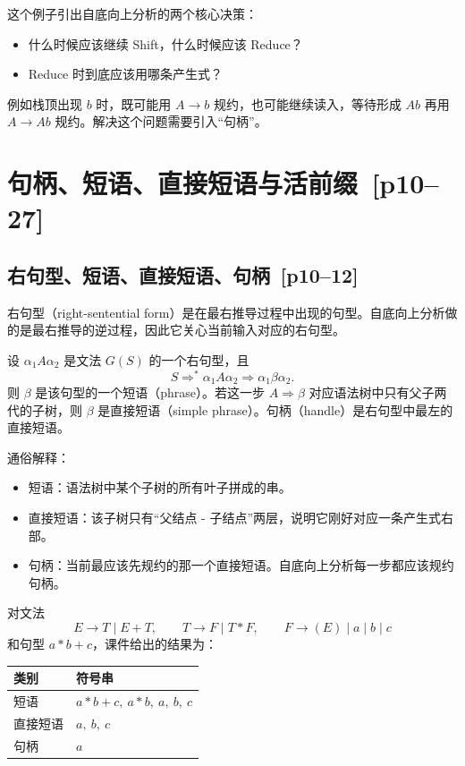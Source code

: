 \documentclass[UTF8,fontset=none,11pt]{ctexart}
\newenvironment{defbox}[1][]{%
  \par\medskip\noindent{\color{defrule}\rule{\linewidth}{1.1pt}}\par\nopagebreak
  \noindent{\bfseries\color{defrule}#1}\par\nopagebreak\smallskip}%
  {\par\nopagebreak\smallskip\noindent{\color{defrule}\rule{\linewidth}{0.4pt}}\par\medskip}
\newcommand{\pg}[1]{\texorpdfstring{{\small\color{graytext}\,[p#1]}}{ [p#1]}}
\begin{document}
这个例子引出自底向上分析的两个核心决策：

\begin{itemize}
  \item 什么时候应该继续 Shift，什么时候应该 Reduce？
  \item Reduce 时到底应该用哪条产生式？
\end{itemize}

例如栈顶出现 \(b\) 时，既可能用 \(A\to b\) 规约，也可能继续读入，等待形成 \(Ab\) 再用 \(A\to Ab\) 规约。解决这个问题需要引入“句柄”。

\section{句柄、短语、直接短语与活前缀 \pg{10--27}}

\subsection{右句型、短语、直接短语、句柄 \pg{10--12}}

\begin{defbox}[右句型]
右句型（right-sentential form）是在最右推导过程中出现的句型。自底向上分析做的是最右推导的逆过程，因此它关心当前输入对应的右句型。
\end{defbox}

\begin{defbox}[短语、直接短语、句柄]
设 \(\alpha_1A\alpha_2\) 是文法 \(G(S)\) 的一个右句型，且
\[
S\Rightarrow^* \alpha_1A\alpha_2 \Rightarrow \alpha_1\beta\alpha_2.
\]
则 \(\beta\) 是该句型的一个短语（phrase）。若这一步 \(A\Rightarrow \beta\) 对应语法树中只有父子两代的子树，则 \(\beta\) 是直接短语（simple phrase）。句柄（handle）是右句型中最左的直接短语。
\end{defbox}

通俗解释：

\begin{itemize}
  \item 短语：语法树中某个子树的所有叶子拼成的串。
  \item 直接短语：该子树只有“父结点 - 子结点”两层，说明它刚好对应一条产生式右部。
  \item 句柄：当前最应该先规约的那一个直接短语。自底向上分析每一步都应该规约句柄。
\end{itemize}

对文法
\[
E\to T\mid E+T,\qquad T\to F\mid T*F,\qquad F\to (E)\mid a\mid b\mid c
\]
和句型 \(a*b+c\)，课件给出的结果为：

\begin{center}
\small
\begin{tabular}{ll}
\toprule
类别 & 符号串 \\
\midrule
短语 & \(a*b+c,\ a*b,\ a,\ b,\ c\) \\
直接短语 & \(a,\ b,\ c\) \\
句柄 & \(a\) \\
\bottomrule
\end{tabular}
\end{center}
\end{document}
